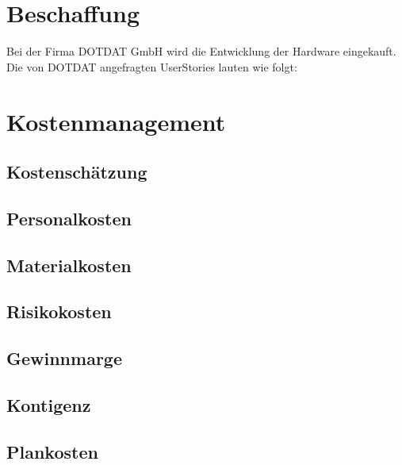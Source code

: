 \section{Beschaffung} %
Bei der Firma DOTDAT GmbH wird die Entwicklung der Hardware eingekauft. Die von DOTDAT angefragten UserStories lauten wie folgt:



\section{Kostenmanagement}



\subsection{Kostenschätzung}
\lipsum[2]
\subsection{Personalkosten} %
\lipsum[2]
\subsection{Materialkosten}
\lipsum[2]
\subsection{Risikokosten}
\lipsum[2]
\subsection{Gewinnmarge}
\lipsum[2]
\subsection{Kontigenz} %
\lipsum[2]
\subsection{Plankosten}
\lipsum[2]





